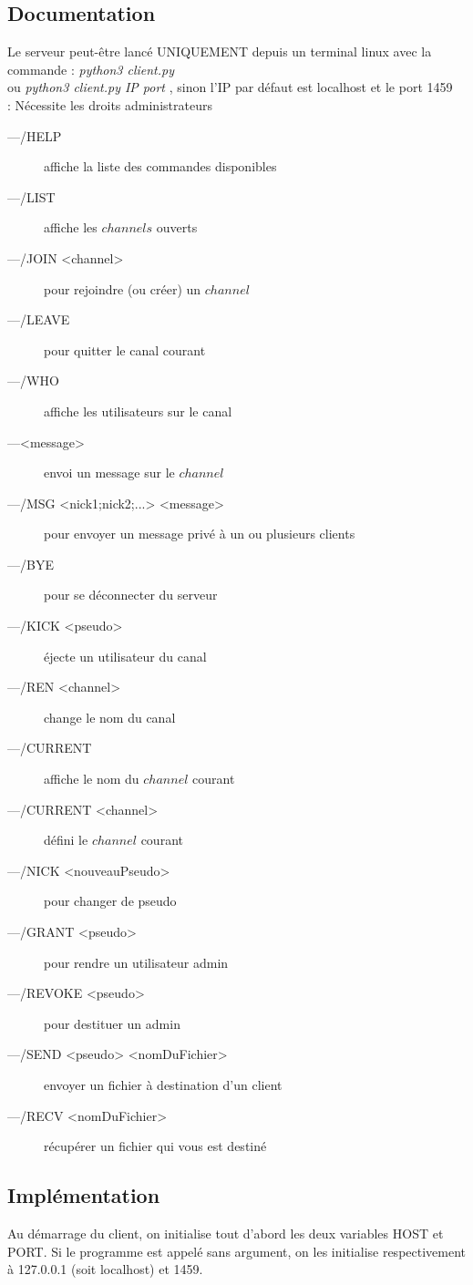 \documentclass[12pt]{article}
\begin{document}
{\subsection{Documentation}
Le serveur peut-être lancé UNIQUEMENT depuis un terminal linux avec
la commande : \emph{python3 client.py}
\\ou \emph{python3 client.py IP port} , sinon l'IP par défaut est localhost et le port 1459
\\ : Nécessite les droits administrateurs
\\
\begin{description}
    \item[---/HELP] affiche la liste des commandes disponibles
\item[---/LIST] affiche les $channels$ ouverts
\item[---/JOIN <channel>] pour rejoindre (ou créer) un $channel$
\item[---/LEAVE] pour quitter le canal courant
\item[---/WHO] affiche les utilisateurs sur le canal
\item[---<message>] envoi un message sur le $channel$
\item[---/MSG <nick1;nick2;...> <message>] pour envoyer un message privé à un ou plusieurs clients
\item[---/BYE] pour se déconnecter du serveur
\item[---/KICK <pseudo>] éjecte un utilisateur du canal
\item[---/REN <channel>] change le nom du canal
\item[---/CURRENT] affiche le nom du $channel$ courant
\item[---/CURRENT <channel>] défini le $channel$ courant
\item[---/NICK <nouveauPseudo>] pour changer de pseudo
\item[---/GRANT <pseudo>] pour rendre un utilisateur admin
\item[---/REVOKE <pseudo>] pour destituer un admin
\item[---/SEND <pseudo> <nomDuFichier>] envoyer un fichier à destination d'un client
\item[---/RECV <nomDuFichier>] récupérer un fichier qui vous est destiné
\end{description}



\subsection{Implémentation}
Au démarrage du client, on initialise tout d'abord les deux variables HOST et PORT.
Si le programme est appelé sans argument, on les initialise respectivement à 127.0.0.1 (soit localhost) et 1459.

}
\end{document}
